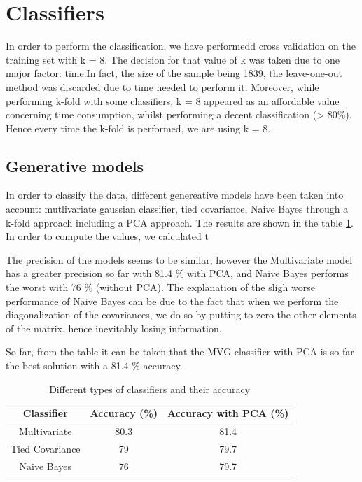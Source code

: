 \documentclass[twoside,a4paper,12pt]{report}
\begin{document}
\section{Classifiers}
In order to perform the classification, we have performedd cross validation on the 
training set with k = 8.
The decision for that value of k was taken due to one major factor: time.In fact, the size of the sample being 
1839, the leave-one-out method was discarded due to time needed to perform it.
Moreover, while performing k-fold with some classifiers, k = 8 appeared as an affordable value 
concerning time consumption, whilst performing a decent classification (> 80\%).
Hence every time the k-fold is performed, we are using k = 8.

\subsection{Generative models}

In order to classify the data, different genereative models have been taken into account:
mutlivariate gaussian classifier, tied covariance, Naive Bayes through a k-fold approach including a PCA approach.
 The results are shown in the table \ref{diffTypesclass}. In order to compute the values, we calculated t
 
 The precision of the models seems to be similar, however the Multivariate  model has a
 greater precision so far with 81.4 \% with PCA, and Naive Bayes performs the worst with 76 \% (without PCA). 
 The explanation of the sligh worse performance of Naive Bayes  can be due to the fact that when we 
 perform the diagonalization of the covariances, we do so by putting to zero the other elements
  of the matrix, hence inevitably losing information. 

 So far, from the table it can be taken that the MVG classifier with PCA is so far the best solution with
  a 81.4 \% accuracy.

\begin{table}[H]
\centering
 \begin{tabular}{||c c c||} 
    \hline \hline
    Classifier & Accuracy (\%) & Accuracy with PCA (\%)\\
    \hline\hline
    Multivariate & 80.3 & \cellcolor{blue!25} 81.4  \\ 
    \hline
    Tied Covariance & 79 & 79.7  \\
    \hline
    Naive Bayes & 76 & 79.7 \\
    \hline \hline
\end{tabular}
\caption{Different types of classifiers and their accuracy\label{diffTypesclass}
}
\end{table}
\end{document}
